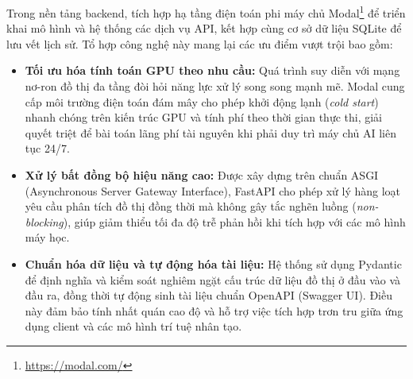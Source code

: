 Trong nền tảng backend, tích hợp hạ tầng điện toán phi máy chủ Modal\footnote{\url{https://modal.com/}} để triển khai mô hình và hệ thống các dịch vụ API, kết hợp cùng cơ sở dữ liệu SQLite để lưu vết lịch sử. Tổ hợp công nghệ này mang lại các ưu điểm vượt trội bao gồm:\vspace{-0.1cm}
\begin{itemize}[label={--}, itemsep=1pt]
    \item \textbf{Tối ưu hóa tính toán GPU theo nhu cầu:} Quá trình suy diễn với mạng nơ-ron đồ thị đa tầng đòi hỏi năng lực xử lý song song mạnh mẽ. Modal cung cấp môi trường điện toán đám mây cho phép khởi động lạnh (\textit{cold start}) nhanh chóng trên kiến trúc GPU và tính phí theo thời gian thực thi, giải quyết triệt để bài toán lãng phí tài nguyên khi phải duy trì máy chủ AI liên tục 24/7.
    \item \textbf{Xử lý bất đồng bộ hiệu năng cao:} Được xây dựng trên chuẩn ASGI (Asynchronous Server Gateway Interface), FastAPI cho phép xử lý hàng loạt yêu cầu phân tích đồ thị đồng thời mà không gây tắc nghẽn luồng (\textit{non-blocking}), giúp giảm thiểu tối đa độ trễ phản hồi khi tích hợp với các mô hình máy học.
    \item \textbf{Chuẩn hóa dữ liệu và tự động hóa tài liệu:} Hệ thống sử dụng Pydantic để định nghĩa và kiểm soát nghiêm ngặt cấu trúc dữ liệu đồ thị ở đầu vào và đầu ra, đồng thời tự động sinh tài liệu chuẩn OpenAPI (Swagger UI). Điều này đảm bảo tính nhất quán cao độ và hỗ trợ việc tích hợp trơn tru giữa ứng dụng client và các mô hình trí tuệ nhân tạo.
\end{itemize}